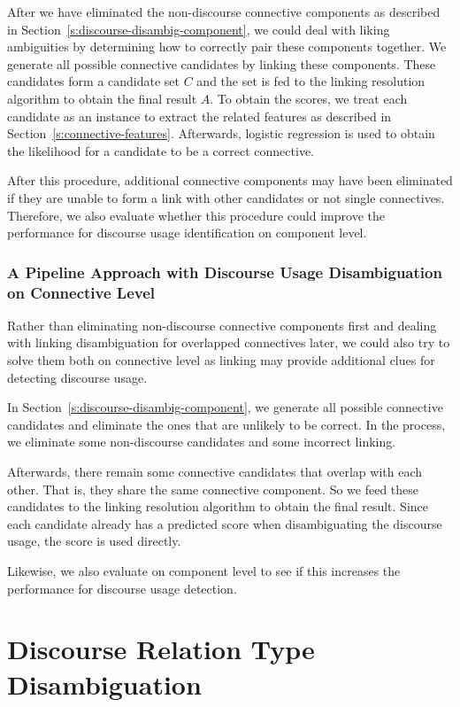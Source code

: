After we have eliminated the non-discourse connective components as described
in Section~\ref{s:discourse-disambig-component}, we could
deal with liking ambiguities by determining how to correctly pair these
components together. We generate all possible connective candidates by
linking these components. These candidates form a candidate set $ C $ and the set is
fed to the linking resolution algorithm to obtain the final result $ A $.
To obtain the scores, we treat each candidate as an instance to
extract the related features as described in Section~\ref{s:connective-features}.
Afterwards, logistic regression is used to obtain the likelihood for a
candidate to be a correct connective.

After this procedure, additional connective components may have been eliminated if
they are unable to form a link with other candidates or not single connectives.
Therefore, we also evaluate whether this procedure could improve the performance
for discourse usage identification on component level.


\subsubsection{A Pipeline Approach with Discourse Usage Disambiguation on Connective Level}
\label{s:pipeline2}

Rather than eliminating non-discourse connective components first and
dealing with linking disambiguation for overlapped connectives later,
we could also try to solve them both on connective level as linking may
provide additional clues for detecting discourse usage. 

In Section~\ref{s:discourse-disambig-component}, we generate all possible
connective candidates and eliminate the ones that are unlikely to be correct.
In the process, we eliminate some non-discourse candidates and some incorrect
linking.

Afterwards, there remain some connective candidates that overlap with each other.
That is, they share the same connective component. So we feed these candidates
to the linking resolution algorithm to obtain the final result. Since each candidate
already has a predicted score when disambiguating the discourse usage, the score
is used directly.

Likewise, we also evaluate on component level to see if this increases
the performance for discourse usage detection.

\section{Discourse Relation Type Disambiguation}

